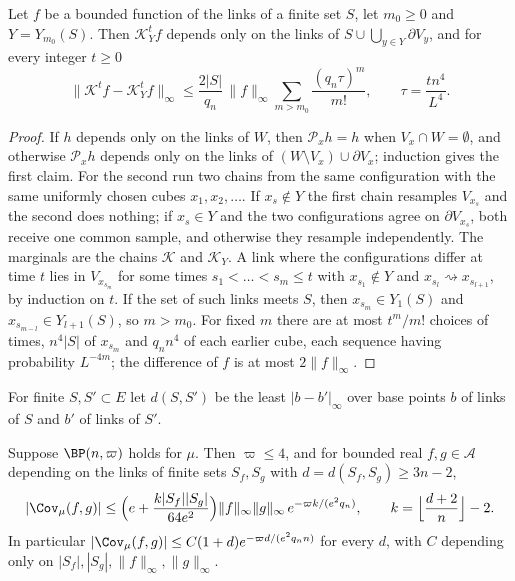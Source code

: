 \begin{lemma}\label{lem:speed}
Let $f$ be a bounded function of the links of a finite set $S$, let $m_0\ge0$
and $Y=Y_{m_0}(S)$. Then $\mathcal K_Y^tf$ depends only on the links of
$S\cup\bigcup_{y\in Y}\partial V_y$, and for every integer $t\ge0$
\[
\bigl\|\mathcal K^tf-\mathcal K_Y^tf\bigr\|_\infty\le\frac{2|S|}{q_n}\,\|f\|_\infty
\sum_{m>m_0}\frac{(q_n\tau)^m}{m!},\qquad\tau=\frac{tn^4}{L^4}.
\]
\end{lemma}

\begin{proof}
If $h$ depends only on the links of $W$, then $\mathcal P_xh=h$ when $V_x\cap W=
\emptyset$, and otherwise $\mathcal P_xh$ depends only on the links of $(W\setminus
V_x)\cup\partial V_x$; induction gives the first claim. For the second run two
chains from the same configuration with the same uniformly chosen cubes
$x_1,x_2,\dots$. If $x_s\notin Y$ the first chain resamples $V_{x_s}$ and the
second does nothing; if $x_s\in Y$ and the two configurations agree on
$\partial V_{x_s}$, both receive one common sample, and otherwise they resample
independently. The marginals are the chains $\mathcal K$ and $\mathcal K_Y$. A
link where the configurations differ at time $t$ lies in $V_{x_{s_m}}$ for some
times $s_1<\dots<s_m\le t$ with $x_{s_1}\notin Y$ and $x_{s_l}\rightsquigarrow
x_{s_{l+1}}$, by induction on $t$. If the set of such links meets $S$, then
$x_{s_m}\in Y_1(S)$ and $x_{s_{m-l}}\in Y_{l+1}(S)$, so $m>m_0$. For fixed $m$
there are at most $t^m/m!$ choices of times, $n^4|S|$ of $x_{s_m}$ and $q_nn^4$
of each earlier cube, each sequence having probability $L^{-4m}$; the
difference of $f$ is at most $2\|f\|_\infty$.
\end{proof}

For finite $S,S'\subset E$ let $d(S,S')$ be the least $|b-b'|_\infty$ over base
points $b$ of links of $S$ and $b'$ of links of $S'$.

\begin{theorem}\label{thm:decay}
Suppose $\BP(n,\varpi)$ holds for $\mu$. Then $\varpi\le4$, and for bounded
real $f,g\in\mathcal A$ depending on the links of finite sets $S_f,S_g$ with
$d=d(S_f,S_g)\ge3n-2$,
\[
|\Cov_\mu(f,g)|\le\Bigl(e+\frac{k|S_f||S_g|}{64e^2}\Bigr)\|f\|_\infty\|g\|_\infty\,
e^{-\varpi k/(e^2q_n)},\qquad k=\Bigl\lfloor\frac{d+2}n\Bigr\rfloor-2 .
\]
In particular $|\Cov_\mu(f,g)|\le C(1+d)e^{-\varpi d/(e^2q_nn)}$ for every $d$,
with $C$ depending only on $|S_f|,|S_g|,\|f\|_\infty,\|g\|_\infty$.
\end{theorem}

